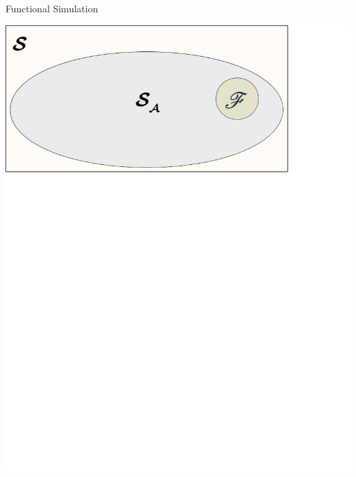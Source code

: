 \documentclass{beamer}
\begin{document}
\begin{frame}{Functional Simulation}
\begin{center}
\includegraphics[scale=0.55]{Images/sd3.png}
\end{center}
\end{frame}
\end{document}
